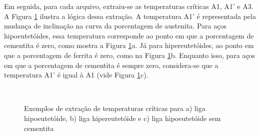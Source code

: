 \documentclass[brazil,tf,epusp]{usp}  %
\begin{document}
Em seguida, para cada arquivo, extraiu-se as temperaturas críticas A1, A1' e A3. A Figura \ref{fig:Tcrit_exemplos} ilustra a lógica dessa extração. A temperatura A1' é representada pela mudança de inclinação na curva da porcentagem de austenita. Para aços hipoeutetóides, essa temperatura corresponde ao ponto em que a porcentagem de cementita é zero, como mostra a Figura \ref{fig:Tcrit_exemplos}a. Já para hipereutetóides, ao ponto em que a porcentagem de ferrita é zero, como na Figura \ref{fig:Tcrit_exemplos}b. Enquanto isso, para aços em que a porcentagem de cementita é sempre zero, considera-se que a temperatura A1' é igual à A1 (vide Figura \ref{fig:Tcrit_exemplos}c).

\begin{figure}
  \hfill
  \\
  \caption{Exemplos de extração de temperaturas críticas para a) liga hipoeutetóide, b) liga hipereutetóide e c) liga hipoeutetóide sem cementita}
  \label{fig:Tcrit_exemplos}
\end{figure}
\end{document}
